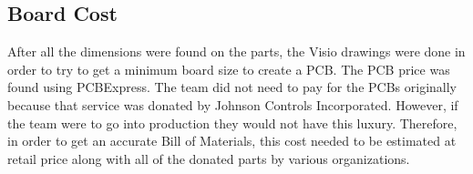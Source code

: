 
\subsection{Board Cost}
After all the dimensions were found on the parts, the Visio drawings were done in order to try to get a minimum board size to create a PCB. The PCB price was found using PCBExpress. The team did not need to pay for the PCBs originally because that service was donated by Johnson Controls Incorporated. However, if the team were to go into production they would not have this luxury. Therefore, in order to get an accurate Bill of Materials, this cost needed to be estimated at retail price along with all of the donated parts by various organizations. 

